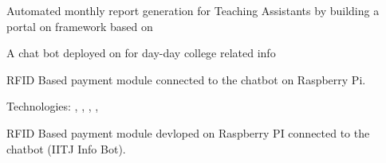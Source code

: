 \documentclass[]{deedy-resume-openfont}
\begin{document}
\begin{minipage}[t]{0.67\textwidth}
\begin{tightemize}


    
\end{tightemize}

\begin{tightemize}
\item Automated monthly report generation for Teaching Assistants by building a portal on  framework based on 
\end{tightemize}

\begin{tightemize}
\item A chat bot deployed on  for day-day college related info
\item RFID Based payment module connected to the chatbot on Raspberry Pi.
\item Technologies: , ,  , , 
\end{tightemize}

\begin{tightemize}
\item RFID Based payment module devloped on Raspberry PI connected to the chatbot (IITJ Info Bot).
\end{tightemize}





\end{minipage}
\end{document}
